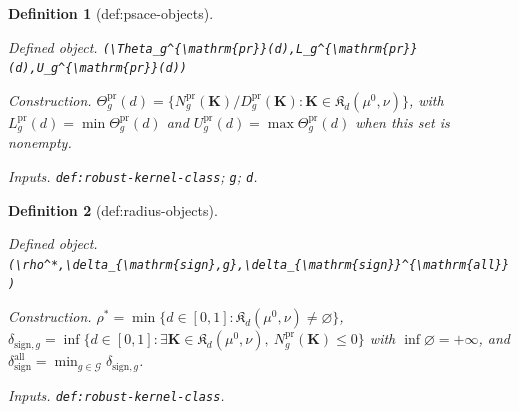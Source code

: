 \documentclass{article}
\newtheorem{definition}{Definition}
\begin{document}
\begin{definition}[def:psace-objects]\label{def:psace-objects}
\par\smallskip\noindent\emph{Defined object.} \texttt{(\textbackslash{}\allowbreak{}Theta\_\allowbreak{}g\textasciicircum{}\{\textbackslash{}\allowbreak{}mathrm\{pr\}\allowbreak{}\}\allowbreak{}(d),\allowbreak{}L\_\allowbreak{}g\textasciicircum{}\{\textbackslash{}\allowbreak{}mathrm\{pr\}\allowbreak{}\}\allowbreak{}(d),\allowbreak{}U\_\allowbreak{}g\textasciicircum{}\{\textbackslash{}\allowbreak{}mathrm\{pr\}\allowbreak{}\}\allowbreak{}(d))}
\par\smallskip\noindent\emph{Construction.} \(\Theta_g^{\mathrm{pr}}(d)=\{N_g^{\mathrm{pr}}(\mathbf K)/D_g^{\mathrm{pr}}(\mathbf K):\mathbf K\in\mathfrak K_d(\mu^0,\nu)\}\), with \(L_g^{\mathrm{pr}}(d)=\min\Theta_g^{\mathrm{pr}}(d)\) and \(U_g^{\mathrm{pr}}(d)=\max\Theta_g^{\mathrm{pr}}(d)\) when this set is nonempty.
\par\smallskip\noindent\emph{Inputs.} \texttt{def:\allowbreak{}robust-\allowbreak{}kernel-\allowbreak{}class}; \texttt{g}; \texttt{d}.
\end{definition}

\begin{definition}[def:radius-objects]\label{def:radius-objects}
\par\smallskip\noindent\emph{Defined object.} \texttt{(\textbackslash{}\allowbreak{}rho\textasciicircum{}*,\allowbreak{}\textbackslash{}\allowbreak{}delta\_\allowbreak{}\{\textbackslash{}\allowbreak{}mathrm\{sign\}\allowbreak{},\allowbreak{}g\}\allowbreak{},\allowbreak{}\textbackslash{}\allowbreak{}delta\_\allowbreak{}\{\textbackslash{}\allowbreak{}mathrm\{sign\}\allowbreak{}\}\allowbreak{}\textasciicircum{}\{\textbackslash{}\allowbreak{}mathrm\{all\}\allowbreak{}\}\allowbreak{})}
\par\smallskip\noindent\emph{Construction.} \(\rho^*=\min\{d\in[0,1]:\mathfrak K_d(\mu^0,\nu)\neq\varnothing\}\), \(\delta_{\mathrm{sign},g}=\inf\{d\in[0,1]:\exists\mathbf K\in\mathfrak K_d(\mu^0,\nu),\ N_g^{\mathrm{pr}}(\mathbf K)\le0\}\) with \(\inf\varnothing=+\infty\), and \(\delta_{\mathrm{sign}}^{\mathrm{all}}=\min_{g\in\mathcal G}\delta_{\mathrm{sign},g}\).
\par\smallskip\noindent\emph{Inputs.} \texttt{def:\allowbreak{}robust-\allowbreak{}kernel-\allowbreak{}class}.
\end{definition}
\end{document}
